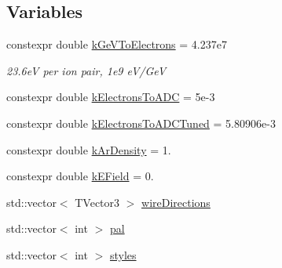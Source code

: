 \subsection*{Variables}
\begin{DoxyCompactItemize}
\item 
constexpr double \hyperlink{namespacecalib_ae60a5755f9f465d0287d277650040d34}{k\-Ge\-V\-To\-Electrons} = 4.\-237e7
\begin{DoxyCompactList}\small\item\em 23.\-6e\-V per ion pair, 1e9 e\-V/\-Ge\-V \end{DoxyCompactList}\item 
constexpr double \hyperlink{namespacecalib_afa4bc041094ec5d0c7d604620bcdfeb5}{k\-Electrons\-To\-A\-D\-C} = 5e-\/3
\item 
constexpr double \hyperlink{namespacecalib_aef1398d9c4d9d9723b373c2d2692b665}{k\-Electrons\-To\-A\-D\-C\-Tuned} = 5.\-80906e-\/3
\item 
constexpr double \hyperlink{namespacecalib_a00c45eddb90e8aca9ed948b1ea350332}{k\-Ar\-Density} = 1.
\item 
constexpr double \hyperlink{namespacecalib_a4c6174bb33f83da964ea510a61693d22}{k\-E\-Field} = 0.
\item 
std\-::vector$<$ T\-Vector3 $>$ \hyperlink{namespacecalib_a05defae1f1c268d06f6e5df5fec34f72}{wire\-Directions}
\item 
std\-::vector$<$ int $>$ \hyperlink{namespacecalib_a9b4f225f6c9c22b36481a71520d7f49d}{pal}
\item 
std\-::vector$<$ int $>$ \hyperlink{namespacecalib_aa542c134baf42651c4ab1026644ec2ea}{styles}
\end{DoxyCompactItemize}

